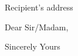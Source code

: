 \documentclass{dcsletter}
\begin{document}

\begin{letter}
   {Recipient's address}

\enlargethispage{-2\baselineskip}
\rule{0pt}{.5in}

\RaggedRight

\opening{Dear Sir/Madam,}


\closing{Sincerely Yours}

\end{letter}
\end{document}
